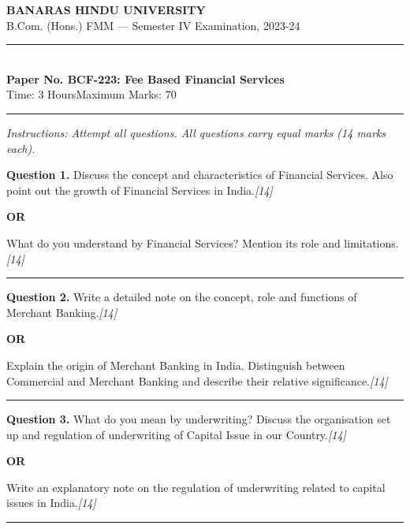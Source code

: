 \documentclass[11pt,a4paper]{article}
\newcommand{\pts}[1]{\hfill   \textit{[#1]}}
\begin{document}
\begin{center}
  {\large\bfseries BANARAS HINDU UNIVERSITY}\\[2pt]
  {\normalsize B.Com. (Hons.) FMM --- Semester IV Examination, 2023-24}\\[6pt]
  \rule{0.8\linewidth}{0.5pt}\\[6pt]
  {\large\bfseries Paper No. BCF-223: Fee Based Financial Services}\\[4pt]
  {\normalsize Time: 3 Hours\hfill Maximum Marks: 70}
\end{center}

\rule{\linewidth}{0.4pt}

\smallskip



\noindent   \textit{Instructions: Attempt all questions. All questions carry equal marks (14 marks each).}

\bigskip




\noindent   \textbf{Question 1.}
Discuss the concept and characteristics of Financial Services. Also point out the growth of Financial Services in India.\pts{14}

\centerline{   \textbf{OR}}

What do you understand by Financial Services? Mention its role and limitations.\pts{14}

\medskip\rule{\linewidth}{0.2pt}




\noindent   \textbf{Question 2.}
Write a detailed note on the concept, role and functions of Merchant Banking.\pts{14}

\centerline{   \textbf{OR}}

Explain the origin of Merchant Banking in India. Distinguish between Commercial and Merchant Banking and describe their relative significance.\pts{14}

\medskip\rule{\linewidth}{0.2pt}




\noindent   \textbf{Question 3.}
What do you mean by underwriting? Discuss the organisation set up and regulation of underwriting of Capital Issue in our Country.\pts{14}

\centerline{   \textbf{OR}}

Write an explanatory note on the regulation of underwriting related to capital issues in India.\pts{14}

\medskip\rule{\linewidth}{0.2pt}
\end{document}
